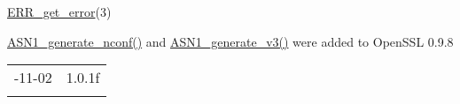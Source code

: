 \documentclass[]{article}
\renewcommand{\emph}[1]{\underline{#1}}
\begin{document}

\emph{ERR\_get\_error}(3)


\emph{ASN1\_generate\_nconf()} and \emph{ASN1\_generate\_v3()} were
added to OpenSSL 0.9.8

\begin{longtable}[c]{@{}ll@{}}
\toprule\addlinespace
2017-11-02 & 1.0.1f
\\\addlinespace
\bottomrule
\end{longtable}
\end{document}
